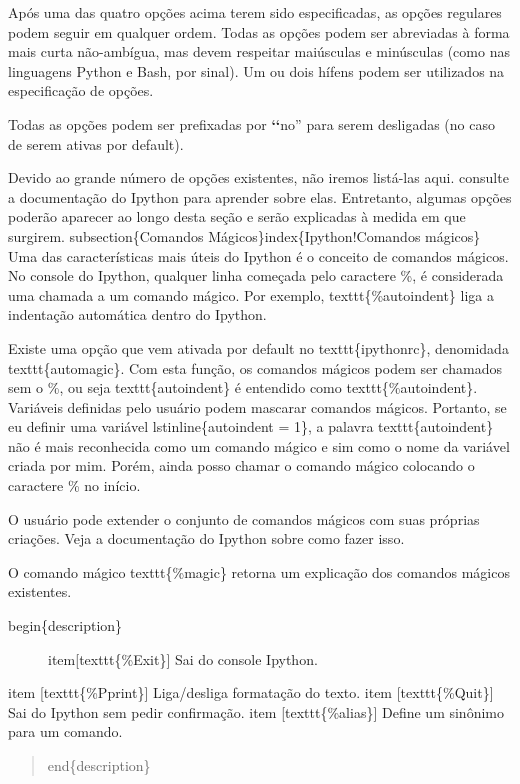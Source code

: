 \documentclass[a4paper,10pt,brazil]{sphinxmanual}
\begin{document}
Após uma das quatro opções acima terem sido especificadas, as opções regulares podem seguir em qualquer ordem. Todas as opções podem ser abreviadas à forma mais curta não-ambígua, mas devem respeitar maiúsculas e minúsculas (como nas linguagens Python e Bash, por sinal). Um ou dois hífens podem ser utilizados na especificação de opções.

Todas as opções podem ser prefixadas por {\color{red}\bfseries{}{}`{}`}no'' para serem desligadas (no caso de serem ativas por default).

Devido ao grande número de opções existentes, não iremos listá-las aqui. consulte a documentação do Ipython para aprender sobre elas. Entretanto, algumas opções poderão aparecer ao longo desta seção e serão explicadas à medida em que surgirem.
subsection\{Comandos Mágicos\}index\{Ipython!Comandos mágicos\}
Uma das características mais úteis do Ipython é o conceito de comandos mágicos. No console do Ipython, qualquer linha começada pelo caractere \%, é considerada uma chamada a um comando mágico. Por exemplo, texttt\{\%autoindent\} liga a indentação automática dentro do Ipython.

Existe uma opção que vem ativada por default no texttt\{ipythonrc\}, denomidada texttt\{automagic\}. Com esta função, os comandos mágicos podem ser chamados sem o \%, ou seja texttt\{autoindent\} é entendido como texttt\{\%autoindent\}. Variáveis definidas pelo usuário podem mascarar comandos mágicos. Portanto, se eu definir uma variável lstinline\{autoindent = 1\}, a palavra texttt\{autoindent\} não é mais reconhecida como um comando mágico e sim como o nome da variável criada por mim. Porém, ainda posso chamar o comando mágico colocando o caractere \% no início.

O usuário pode extender o conjunto de comandos mágicos com suas próprias criações. Veja a documentação do Ipython sobre como fazer isso.

O comando mágico texttt\{\%magic\} retorna um explicação dos comandos mágicos existentes.
\begin{description}
\item[{begin\{description\}}] \leavevmode
item{[}texttt\{\%Exit\}{]} Sai do console Ipython.

\end{description}

item {[}texttt\{\%Pprint\}{]} Liga/desliga formatação do texto.
item {[}texttt\{\%Quit\}{]} Sai do Ipython sem pedir confirmação.
item {[}texttt\{\%alias\}{]} Define um sinônimo para um comando.
\begin{quote}

end\{description\}
\end{quote}
\end{document}
